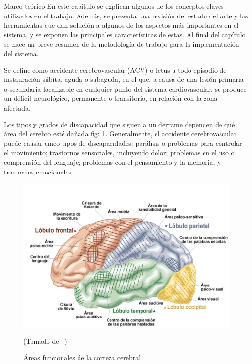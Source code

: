 \begin{thesischapter}{1} {Marco teórico}
    En este capítulo se explican algunos de los conceptos claves utilizados en el trabajo. Además, se presenta una revisión del estado del arte y las herramientas que dan solución a algunos de los aspectos más importantes en el sistema, y se exponen
    las principales características de estas. Al final del capítulo se hace un breve resumen de la metodología de trabajo para la implementación del sistema.

    
    \vspace{10pt}
    Se define como accidente cerebrovascular (ACV) o Ictus a todo episodio de
    instauración súbita, aguda o subaguda, en el que, a causa de una lesión primaria o
    secundaria localizable en cualquier punto del sistema cardiovascular, se produce un
    déficit neurológico, permanente o transitorio, en relación con la zona afectada.~\cite{ictus}

    \vspace{10pt}
    Los tipos y grados de discapacidad que siguen a un derrame dependen de qué área
    del cerebro esté dañada fig: \ref{fig: cerebralcortex}. Generalmente, el accidente cerebrovascular puede
    causar cinco tipos de discapacidades: parálisis o problemas para controlar el movimiento;
    trastornos sensoriales, incluyendo dolor; problemas en el uso o comprensión del
    lenguaje; problemas con el pensamiento y la memoria, y trastornos emocionales.~\cite{post-strok} 
    \begin{figure}[ht]
        \centering
        \includegraphics[scale=0.5]{images/brain.jpg}
        \caption{Áreas funcionales de la corteza cerebral}
        (Tomado de ~\cite{areacereabral})
        \label{fig: cerebralcortex}
    \end{figure}


\end{thesischapter}
